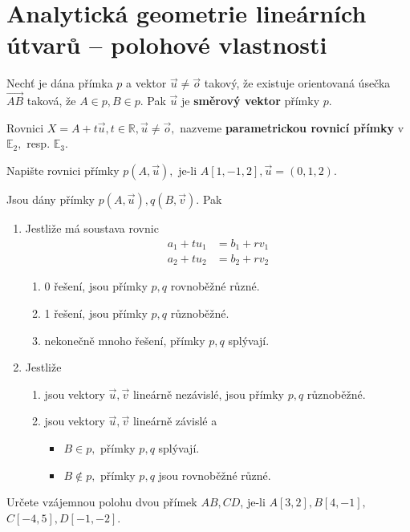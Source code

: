 \section{Analytická geometrie lineárních útvarů -- polohové vlastnosti}
\begin{definition}
    Nechť je dána přímka $p$ a vektor $\vec u\ne \vec o$
    takový, že existuje orientovaná úsečka $\overrightarrow{AB}$ taková, že
     $A\in p, B\in p.$ Pak $\vec u$
    je \textbf{směrový vektor} přímky $p.$
\end{definition}

\begin{definition}
    Rovnici $X = A+t\vec u, t\in \mathbb R, \vec u \ne  \vec o,$ nazveme
    \textbf{parametrickou rovnicí přímky} v $\mathbb E_2,$ resp. $\mathbb E_3.$
\end{definition}

\begin{priklad}
Napište rovnici přímky $p(A,\vec u),$ je-li $A[1,-1,2], \vec u = (0,1,2).$
\end{priklad}

\begin{veta}
    Jsou dány přímky $p(A,\vec u), q(B,\vec v).$ Pak
    \begin{enumerate}[$i.$]
    \item Jestliže má soustava rovnic
    \begin{align*}
        a_1+tu_1 &= b_1 + rv_1 \\
        a_2+tu_2 &= b_2 + rv_2
    \end{align*}
    \begin{enumerate}[$a.$]
    \item 0 řešení, jsou přímky $p,q$ rovnoběžné různé.
   	\item 1 řešení, jsou přímky $p,q$ různoběžné.
   	\item nekonečně mnoho řešení, přímky $p,q$ splývají.
    \end{enumerate}
   	\item Jestliže
    \begin{enumerate}[$a.$]
    \item jsou vektory $\vec u, \vec v$ lineárně nezávislé, jsou přímky $p,q$ různoběžné.
   	\item jsou vektory $\vec u, \vec v$ lineárně závislé a
   	\begin{itemize}
    \item $B\in p,$ přímky $p,q$ splývají.
   	\item $B\notin p,$ přímky $p,q$ jsou rovnoběžné různé.
    \end{itemize}
    \end{enumerate}
    \end{enumerate}
\end{veta}
\begin{priklad}
Určete vzájemnou polohu dvou přímek $AB, CD$, je-li $A[3,2], B[4,-1],$\linebreak $C[-4,5],D[-1,-2]$.
\end{priklad}

